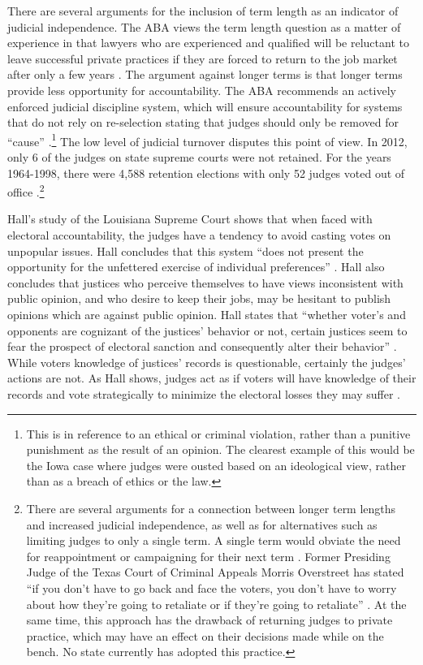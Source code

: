 \documentclass[12pt]{article}
\begin{document}
There are several arguments for the inclusion of term length as an indicator of judicial independence. The ABA views the term length question as a matter of experience in that lawyers who are experienced and qualified will be reluctant to leave successful private practices if they are forced to return to the job market after only a few years \citep[97]{ABA2003}.   The argument against longer terms is that longer terms provide less opportunity for accountability. The ABA recommends an actively enforced judicial discipline system, which will ensure accountability for systems that do not rely on re-selection stating that judges should only be removed for ``cause'' \citep[103]{ABA2003}.\footnote{This is in reference to an ethical or criminal violation, rather than a punitive punishment as the result of an opinion.  The clearest example of this would be the Iowa case where judges were ousted based on an ideological view, rather than as a breach of ethics or the law.}  The low level of judicial turnover disputes this point of view. In 2012, only 6 of the judges on state supreme courts were not retained. For the years 1964-1998, there were 4,588 retention elections with only 52 judges voted out of office \citep{Aspin2000}.\footnote{There are several arguments for a connection between longer term lengths and increased judicial independence, as well as for alternatives such as limiting judges to only a single term. A single term would obviate the need for reappointment or campaigning for their next term \citep{Carrington1998}.  Former Presiding Judge of the Texas Court of Criminal Appeals Morris Overstreet has stated ``if you don't have to go back and face the voters, you don't have to worry about how they're going to retaliate or if they're going to retaliate'' \citep{ABA2003}.  At the same time, this approach has the drawback of returning judges to private practice, which may have an effect on their decisions made while on the bench.  No state currently has adopted this practice.}

Hall's \citeyearpar{Hall1987a} study of the Louisiana Supreme Court shows that when faced with electoral accountability, the judges have a tendency to avoid casting votes on unpopular issues. Hall concludes that this system ``does not present the opportunity for the unfettered exercise of individual preferences'' \citep[46]{Hall1987a}.  Hall also concludes that justices who perceive themselves to have views inconsistent with public opinion,  and who desire to keep their jobs, may be hesitant to publish opinions which are against public opinion. Hall states that ``whether voter's and opponents are cognizant of the justices’ behavior or not, certain justices seem to fear the prospect of electoral sanction and consequently alter their behavior'' \citep[1123]{Hall1987b}.  While voters knowledge of justices' records is questionable, certainly the judges' actions are not.  As Hall shows, judges act as if voters will have knowledge of their records and vote strategically to minimize the electoral losses they may suffer \citep{Hall1987b}.
\end{document}
